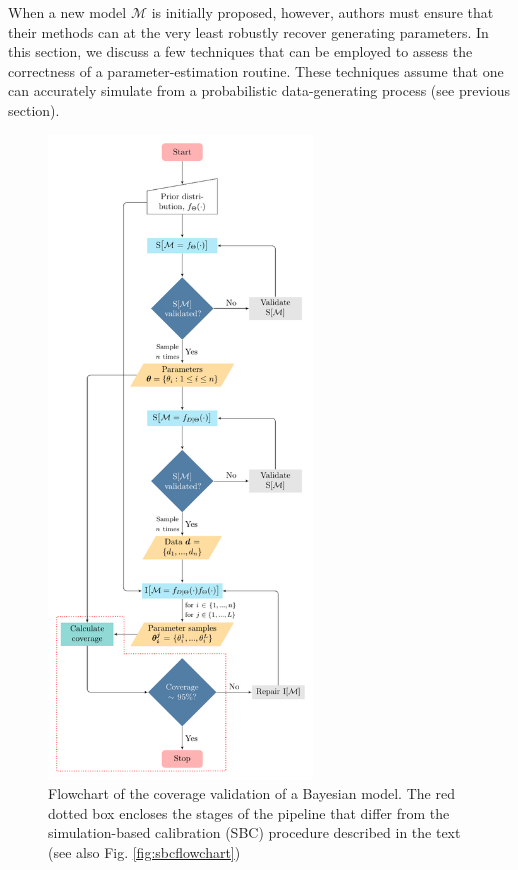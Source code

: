 \documentclass[oneside]{article}
\begin{document}
When a new model $\mathcal{M}$ is initially proposed, however, authors must ensure that their methods 
can at the very least robustly recover generating parameters.
In this section, we discuss a few techniques that can be employed to assess the correctness of a parameter-estimation routine.
These techniques assume that one can accurately simulate from a
probabilistic data-generating process (see previous section).
\begin{figure}
  \includegraphics[width=7cm]{../figures/flowchart.pdf}
  \caption{Flowchart of the coverage validation of a Bayesian
    model. The red dotted box encloses the stages of the pipeline that
  differ from the simulation-based calibration (SBC) procedure
  described in the text (see also Fig. \ref{fig:sbcflowchart})}
\label{fig:flowchart}
\vspace{2cm}
\end{figure}
\end{document}
